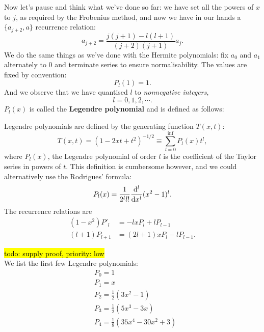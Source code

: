 Now let's pause and think what we've done so far: we have set all the powers 
of $x$ to $j$, as required by the Frobenius method, and now we have in our 
hands a $\{a_{j+2},a\}$ recurrence relation: 
\begin{equation}
a_{j+2}=\frac{j(j+1)-l(l+1)}{(j+2)(j+1)}a_j. 
\end{equation}
We do the same things as we've done with the Hermite polynomials: 
fix $a_0$ and $a_1$ alternately to $0$ and terminate series to ensure 
normalisability. The values are fixed by convention: 
\begin{equation}
P_l(1)=1.
\end{equation}
And we observe that we have quantised $l$ to \textit{nonnegative integers}, \ie
\begin{equation}
l=0,1,2,\cdots.
\end{equation}
$P_l(x)$ is called the \textbf{Legendre polynomial} and is defined as follows: 
\begin{defi}
Legendre polynomials are defined by the generating function $T(x,t)$:
\begin{equation}
T(x,t)=(1-2xt+t^2)^{-1/2}\equiv \sum^{\inf}_{l=0} P_l(x)t^l, 
\end{equation}
where $P_l(x)$, the Legendre polynomial of order $l$ is the coefficient of 
the Taylor series in powers of $t$. This definition is cumbersome however, and 
we could alternatively use the Rodrigues' formula:
\begin{equation}
P_l(x)=\frac{1}{2^ll!}\diff*[l]{(x^2-1)^l}x. 
\end{equation}
The recurrence relations are
\begin{subequations}
\begin{align}
(1-x^2)P'_l&=-lxP_l+lP_{l-1}\\
(l+1)P_{l+1}&=(2l+1)xP_l-lP_{l-1}.
\end{align}
\end{subequations}
\end{defi}
\hl{todo: supply proof, priority: low}\\
We list the first few Legendre polynomials: 
\begin{subequations}
\begin{align}
&P_0=1\\
&P_1=x\\
&P_2=\frac{1}{2}(3x^2-1)\\
&P_3=\frac{1}{2}(5x^3-3x)\\
&P_4=\frac{1}{8}(35x^4-30x^2+3)
\end{align}
\end{subequations}
